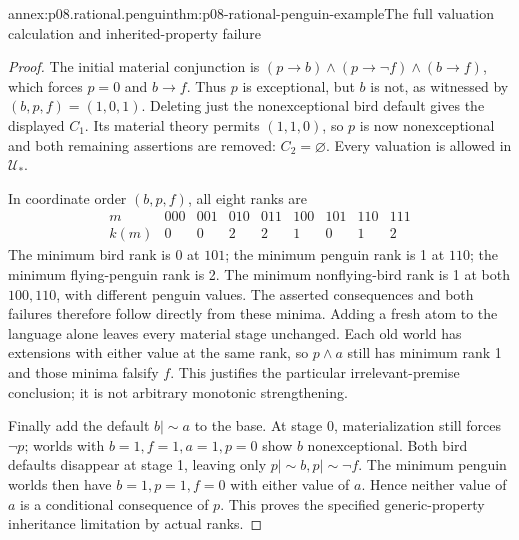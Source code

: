 \begin{annexitem}{annex:p08.rational.penguin}{thm:p08-rational-penguin-example}{The full valuation calculation and inherited-property failure}
\begin{proof}
The initial material conjunction is
\((p\to b)\wedge(p\to\neg f)\wedge(b\to f)\),
which forces \(p=0\) and \(b\to f\). Thus \(p\) is
exceptional, but \(b\) is not, as witnessed by \((b,p,f)=(1,0,1)\).
Deleting just the nonexceptional bird default gives the displayed
\(C_1\). Its material theory permits \((1,1,0)\), so \(p\)
is now nonexceptional and both remaining assertions are removed:
\(C_2=\varnothing\). Every valuation is allowed in \(\mathcal U_*\).

In coordinate order \((b,p,f)\), all eight ranks are
\[
\begin{array}{c|cccccccc}
m&000&001&010&011&100&101&110&111\\\hline
k(m)&0&0&2&2&1&0&1&2
\end{array}
\]
The minimum bird rank is 0 at \(101\); the minimum penguin rank
is 1 at \(110\); the minimum flying-penguin rank is 2.
The minimum nonflying-bird rank is 1 at both \(100,110\), with
different penguin values. The asserted consequences and both failures
therefore follow directly from these minima.
Adding a fresh atom to the language alone leaves every material stage
unchanged. Each old world has extensions with either value at the same
rank, so \(p\wedge a\) still has minimum rank 1 and those minima
falsify \(f\). This justifies the particular irrelevant-premise
conclusion; it is not arbitrary monotonic strengthening.

Finally add the default \(b\mathrel{|\!\sim}a\) to the base.
At stage 0, materialization still forces \(\neg p\); worlds with
\(b=1,f=1,a=1,p=0\) show \(b\) nonexceptional. Both bird
defaults disappear at stage 1, leaving only
\(p\mathrel{|\!\sim}b,p\mathrel{|\!\sim}\neg f\).
The minimum penguin worlds then have \(b=1,p=1,f=0\) with
either value of \(a\). Hence neither value of \(a\) is a
conditional consequence of \(p\). This proves the specified
generic-property inheritance limitation by actual ranks.
\end{proof}
\end{annexitem}

